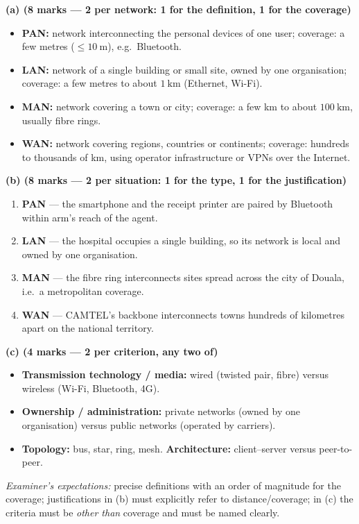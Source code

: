 \documentclass[11pt]{article}
\begin{document}
\begin{corrige}
\textbf{(a) (8 marks — 2 per network: 1 for the definition, 1 for the coverage)}
\begin{itemize}
\item \textbf{PAN:} network interconnecting the personal devices of one user; coverage: a few metres ($\leq 10\ \mathrm{m}$), e.g.\ Bluetooth.
\item \textbf{LAN:} network of a single building or small site, owned by one organisation; coverage: a few metres to about $1\ \mathrm{km}$ (Ethernet, Wi-Fi).
\item \textbf{MAN:} network covering a town or city; coverage: a few km to about $100\ \mathrm{km}$, usually fibre rings.
\item \textbf{WAN:} network covering regions, countries or continents; coverage: hundreds to thousands of km, using operator infrastructure or VPNs over the Internet.
\end{itemize}
\textbf{(b) (8 marks — 2 per situation: 1 for the type, 1 for the justification)}
\begin{enumerate}
\item \textbf{PAN} — the smartphone and the receipt printer are paired by Bluetooth within arm's reach of the agent.
\item \textbf{LAN} — the hospital occupies a single building, so its network is local and owned by one organisation.
\item \textbf{MAN} — the fibre ring interconnects sites spread across the city of Douala, i.e.\ a metropolitan coverage.
\item \textbf{WAN} — CAMTEL's backbone interconnects towns hundreds of kilometres apart on the national territory.
\end{enumerate}
\textbf{(c) (4 marks — 2 per criterion, any two of)}
\begin{itemize}
\item \textbf{Transmission technology / media:} wired (twisted pair, fibre) versus wireless (Wi-Fi, Bluetooth, 4G).
\item \textbf{Ownership / administration:} private networks (owned by one organisation) versus public networks (operated by carriers).
\item \textbf{Topology:} bus, star, ring, mesh. \quad \textbf{Architecture:} client--server versus peer-to-peer.
\end{itemize}
\emph{Examiner's expectations:} precise definitions with an order of magnitude for the coverage; justifications in (b) must explicitly refer to distance/coverage; in (c) the criteria must be \emph{other than} coverage and must be named clearly.
\end{corrige}
\end{document}
